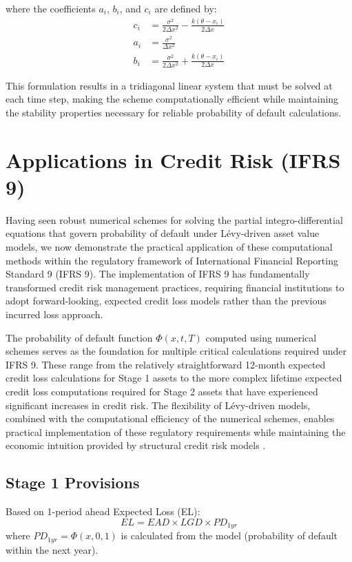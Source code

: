 \documentclass[11pt,twoside,openright]{report}
\begin{document}
where the coefficients $a_i$, $b_i$, and $c_i$ are defined by:
\begin{align}
c_i &= \frac{\sigma^2}{2\Delta x^2} - \frac{k(\theta - x_i)}{2\Delta x} \\
a_i &= \frac{\sigma^2}{\Delta x^2} \\
b_i &= \frac{\sigma^2}{2\Delta x^2} + \frac{k(\theta - x_i)}{2\Delta x}
\end{align}

This formulation results in a tridiagonal linear system that must be solved at each time step, making the scheme computationally efficient while maintaining the stability properties necessary for reliable probability of default calculations.

\section{Applications in Credit Risk (IFRS 9)}

Having seen robust numerical schemes for solving the partial integro-differential equations that govern probability of default under Lévy-driven asset value models, we now demonstrate the practical application of these computational methods within the regulatory framework of International Financial Reporting Standard 9 (IFRS 9). The implementation of IFRS 9 has fundamentally transformed credit risk management practices, requiring financial institutions to adopt forward-looking, expected credit loss models rather than the previous incurred loss approach.

The probability of default function $\Phi(x, t, T)$ computed using numerical schemes serves as the foundation for multiple critical calculations required under IFRS 9. These range from the relatively straightforward 12-month expected credit loss calculations for Stage 1 assets to the more complex lifetime expected credit loss computations required for Stage 2 assets that have experienced significant increases in credit risk. The flexibility of Lévy-driven models, combined with the computational efficiency of the numerical schemes, enables practical implementation of these regulatory requirements while maintaining the economic intuition provided by structural credit risk models \cite{georgiou2023thesis}.

\subsection{Stage 1 Provisions}
Based on 1-period ahead Expected Loss (EL):
$$ EL = EAD \times LGD \times PD_{1yr} $$
where $PD_{1yr} = \Phi(x, 0, 1)$ is calculated from the model (probability of default within the next year).
\end{document}
